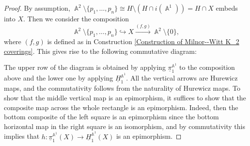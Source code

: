 \documentclass[english]{amsart}
\theoremstyle{definition}
\DeclareMathOperator{\A}{\mathbb{A}}
\DeclareMathOperator{\KK}{\underline{K}}
\DeclareMathOperator{\MW}{MW}
\begin{document}
\begin{proof}
By assumption, $\A^2\setminus\{p_1,\dots,p_n\} \cong H \setminus (H\cap i(\A^1))= H \cap X$ embeds into $X$. Then we consider the composition
\[
\A^2\setminus\{p_1,\dots,p_n\}\hookrightarrow X \xrightarrow{(f,g)} \A^2\setminus\{0\},
\]
where $(f,g)$ is defined as in Construction \ref{Construction of Milnor--Witt K_2 coverings}. This gives rise to the following commutative diagram:
\begin{center}
\end{center}
The upper row of the diagram is obtained by applying $\underline{\pi}_1^{\A^1}$ to the composition above and the lower one by applying $\underline{H}_1^{\A^1}$. All the vertical arrows are Hurewicz maps, and the commutativity follows from the naturality of Hurewicz maps. To show that the middle vertical map is an epimorphism, it suffices to show that the composite map across the whole rectangle is an epimorphism. Indeed, then the bottom composite of the left square is an epimorphism since the bottom horizontal map in the right square is an isomorphism, and by commutativity this implies that $h\colon\underline{\pi}_1^{\A^1}(X)\to\underline{H}_1^{\A^1}(X)$ is an epimorphism.


\end{proof}
\end{document}
